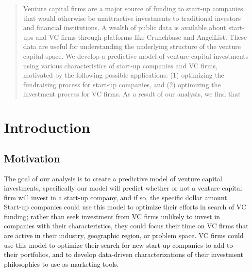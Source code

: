 \documentclass{article}
\begin{document}
 


\begin{abstract}
Venture capital firms are a major source of funding to start-up companies that would otherwise be unattractive investments to traditional investors and financial institutions. A wealth of public data is available about start-ups and VC firms through platforms like Crunchbase and AngelList. These data are useful for understanding the underlying structure of the venture capital space. We develop a predictive model of venture capital investments using various characteristics of start-up companies and VC firms, motivated by the following possible applications: (1) optimizing the fundraising process for start-up companies, and (2) optimizing the investment process for VC firms. As a result of our analysis, we find that 
\end{abstract}

\vspace{-0.3in}

\section{Introduction}

\subsection{Motivation}
The goal of our analysis is to create a predictive model of venture capital investments, specifically our model will predict whether or not a venture capital firm will invest in a start-up company, and if so, the specific dollar amount. Start-up companies could use this model to optimize their efforts in search of VC funding; rather than seek investment from VC firms unlikely to invest in companies with their characteristics, they could focus their time on VC firms that are active in their industry, geographic region, or problem space. VC firms could use this model to optimize their search for new start-up companies to add to their portfolios, and to develop data-driven characterizations of their investment philosophies to use as marketing tools.
\end{document}
